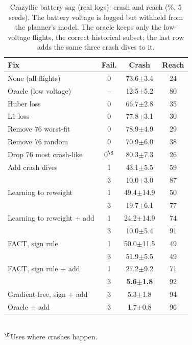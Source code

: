 \documentclass[preprint,12pt]{elsarticle}
\newcommand{\method}{FACT}
\newcommand{\pmse}[2]{#1{\scriptsize$\pm$#2}}
\begin{document}
\begin{table}[t]
\caption{Crazyflie battery sag (real logs): crash and reach (\%, 5 seeds). The battery voltage is logged but withheld from the planner's model. The oracle keeps only the low-voltage flights, the correct historical subset; the last row adds the same three crash dives to it.}
\label{tab:cf}
\centering\footnotesize
\setlength{\tabcolsep}{4pt}
\begin{tabular}{@{}lccc@{}}
\toprule
Fix & Fail. & Crash & Reach \\
\midrule
None (all flights) & 0 & \pmse{73.6}{3.4} & 24 \\
Oracle (low voltage) & -- & \pmse{12.5}{5.2} & 80 \\
Huber loss & 0 & \pmse{66.7}{2.8} & 35 \\
L1 loss & 0 & \pmse{77.8}{3.1} & 30 \\
Remove 76 worst-fit & 0 & \pmse{78.9}{4.9} & 29 \\
Remove 76 random & 0 & \pmse{70.9}{6.0} & 38 \\
Drop 76 most crash-like & 0$^\S$ & \pmse{80.3}{7.3} & 26 \\
Add crash dives & 1 & \pmse{43.1}{5.5} & 59 \\
 & 3 & \pmse{10.0}{3.0} & 87 \\
Learning to reweight & 1 & \pmse{49.4}{14.9} & 50 \\
 & 3 & \pmse{19.7}{6.1} & 77 \\
Learning to reweight + add & 1 & \pmse{24.2}{14.9} & 74 \\
 & 3 & \pmse{10.0}{5.4} & 91 \\
\method{}, sign rule & 1 & \pmse{50.0}{11.5} & 49 \\
 & 3 & \pmse{51.9}{5.5} & 49 \\
\method{}, sign rule + add & 1 & \pmse{27.2}{9.2} & 71 \\
 & 3 & \textbf{\pmse{5.6}{1.8}} & 92 \\
Gradient-free, sign + add & 3 & \pmse{5.3}{1.8} & 94 \\
Oracle + add & 3 & \pmse{1.7}{0.8} & 96 \\
\bottomrule
\end{tabular}\\[2pt]
\footnotesize $^\S$Uses where crashes happen.
\end{table}
\end{document}
